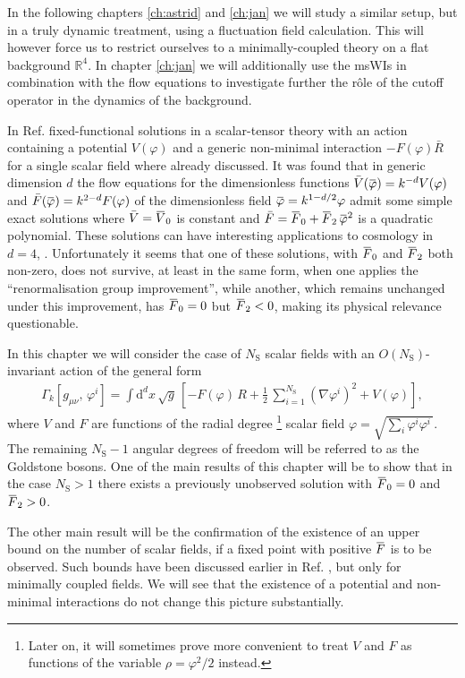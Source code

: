 \documentclass[11pt]{book}
\newcommand{\overbar}[1]{\mkern 1.5mu\overline{\mkern-1.5mu#1\mkern-1.5mu}\mkern 1.5mu}
\newcommand\gmunu{ g_{\mu\nu} }
\newcommand\NS{ N_{\scriptscriptstyle{\mathrm{S}}} }
\newcommand{\bV}{\overbar V}
\newcommand{\bF}{\overbar F}
\newcommand{\bp}{\overbar \varphi}
\numberwithin{equation}{chapter}
\begin{document}
In the following chapters \ref{ch:astrid} and \ref{ch:jan} we will study a similar setup,
but in a truly dynamic treatment, using a fluctuation field calculation.
This will however force us to restrict ourselves to a minimally-coupled theory
on a flat background $\mathbb R^4$.
In chapter \ref{ch:jan} we will additionally use the msWIs in combination with
the flow equations to investigate further the r\^ole of the cutoff operator
in the dynamics of the background.

In Ref. \cite{Percacci:2015wwa} fixed-functional solutions
in a scalar-tensor theory with an action containing a potential $V(\varphi)$
and a generic non-minimal interaction $-F(\varphi) \bar R$ for a single scalar field
where already discussed.
It was found that in generic dimension $d$ the flow equations for the dimensionless
functions $\bar V(\bp)= k^{-d} V(\varphi)$ and $\bar F(\bp)=k^{2-d}F(\varphi)$
of the dimensionless field $\bp = k^{1-d/2} \varphi$
admit some simple exact solutions where $\bar V = \bV_0$ is constant and
$\bar F = \bF_0 + \bF_2 \, \bp^2$ is a quadratic polynomial.
These solutions can have interesting applications to cosmology in $d=4$,
\cite{Henz:2013oxa}.
Unfortunately it seems that one of these solutions,
with $\bF_0$ and $\bF_2$ both non-zero, does not survive,
at least in the same form, when one applies the
``renormalisation group improvement'',
while another, which remains unchanged under this improvement,
has $\bF_0=0$ but $\bF_2<0$, making its physical relevance questionable.

In this chapter we will consider the case of $\NS$ scalar fields with
an $O(\NS)$-invariant action of the general form
\begin{align}
  \Gamma_k [\gmunu, \, \varphi^i] =
  \int \mathrm d^dx \, \sqrt{g} \,
  \left[ - F(\varphi) \, R + \frac{1}{2} \, \sum_{i=1}^{\NS} \left( \nabla\varphi^i \right)^2 + V(\varphi)  \right] ,
  \label{action}
\end{align}
where $V$ and $F$ are functions of the radial degree%
\footnote{
Later on, it will sometimes prove more convenient to treat
$V$ and $F$ as functions of the variable $\rho=\varphi^2/2$ instead.
} scalar field
$\varphi=\sqrt{\sum_i \varphi^i \varphi^i \,}$.
The remaining $\NS-1$ angular degrees of freedom will be referred to as the Goldstone bosons.
One of the main results of this chapter will be to show that in the case
$\NS>1$ there exists a previously unobserved solution with $\bF_0=0$ and $\bF_2>0$.

The other main result will be the confirmation
of the existence  of an upper bound on the number of scalar fields,
if a fixed point with positive $\bF$ is to be observed.
Such bounds have been discussed earlier in Ref. \cite{Dona:2013qba},
but only for minimally coupled fields.
We will see that the existence of a potential and non-minimal interactions do
not change this picture substantially.
\end{document}
